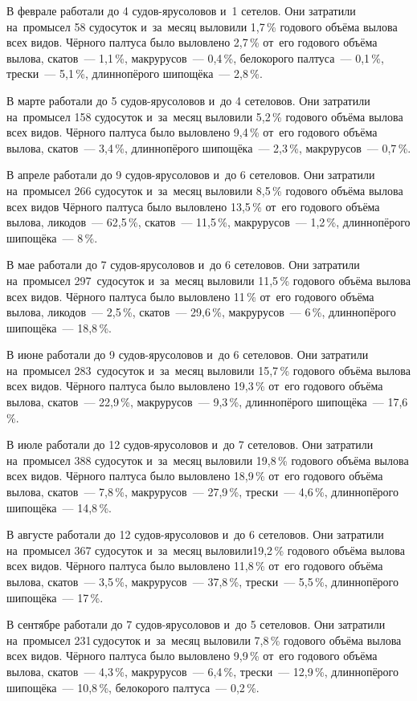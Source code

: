 В феврале работали до 4 судов-ярусоловов и~1 сетелов. Они затратили на~промысел 58 судосуток и~за~месяц выловили 1,7\,\% годового объёма вылова всех видов. Чёрного палтуса было выловлено 2,7\,\% от~его годового объёма вылова, скатов~--- 1,1\,\%, макрурусов~--- 0,4\,\%, белокорого палтуса~--- 0,1\,\%, трески~--- 5,1\,\%, длиннопёрого шипощёка~--- 2,8\,\%.

В марте работали до 5 судов-ярусоловов и~до 4 сетеловов. Они затратили на~промысел 158 судосуток и~за~месяц выловили 5,2\,\% годового объёма вылова всех видов. Чёрного палтуса было выловлено 9,4\,\% от~его годового объёма вылова, скатов~--- 3,4\,\%, длиннопёрого шипощёка~--- 2,3\,\%, макрурусов~--- 0,7\,\%.

В апреле работали до 9 судов-ярусоловов и~до 6 сетеловов. Они затратили на~промысел 266 судосуток и~за~месяц выловили 8,5\,\% годового объёма вылова всех видов Чёрного палтуса было выловлено 13,5\,\% от~его годового объёма вылова, ликодов~--- 62,5\,\%, скатов~--- 11,5\,\%, макрурусов~--- 1,2\,\%, длиннопёрого шипощёка~--- 8\,\%.

В мае работали до 7 судов-ярусоловов и~до 6 сетеловов. Они затратили на~промысел 297~судосуток и~за~месяц выловили 11,5\,\% годового объёма вылова всех видов. Чёрного палтуса было выловлено 11\,\% от~его годового объёма вылова, ликодов~--- 2,5\,\%, скатов~--- 29,6\,\%, макрурусов~--- 6\,\%, длиннопёрого шипощёка~--- 18,8\,\%.

В июне работали до 9 судов-ярусоловов и~до 6 сетеловов. Они затратили на~промысел 283~судосуток и~за~месяц выловили 15,7\,\% годового объёма вылова всех видов. Чёрного палтуса было выловлено 19,3\,\% от~его годового объёма вылова, скатов~--- 22,9\,\%, макрурусов~--- 9,3\,\%, длиннопёрого шипощёка~--- 17,6\,\%.

В июле работали до 12 судов-ярусоловов и~до 7 сетеловов. Они затратили на~промысел 388 судосуток и~за~месяц выловили 19,8\,\% годового объёма вылова всех видов. Чёрного палтуса было выловлено 18,9\,\% от~его годового объёма вылова, скатов~--- 7,8\,\%, макрурусов~--- 27,9\,\%, трески~--- 4,6\,\%, длиннопёрого шипощёка~--- 14,8\,\%.

В августе работали до 12 судов-ярусоловов и~до 6 сетеловов. Они затратили на~промысел 367 судосуток и~за~месяц выловили19,2\,\% годового объёма вылова всех видов. Чёрного палтуса было выловлено 11,8\,\% от~его годового объёма вылова, скатов~--- 3,5\,\%, макрурусов~--- 37,8\,\%, трески~--- 5,5\,\%, длиннопёрого шипощёка~--- 17\,\%.

В сентябре работали до 7 судов-ярусоловов и~до 5 сетеловов. Они затратили на~промысел 231\,судосуток и~за~месяц выловили 7,8\,\% годового объёма вылова всех видов. Чёрного палтуса было выловлено 9,9\,\% от~его годового объёма вылова, скатов~--- 4,3\,\%, макрурусов~--- 6,4\,\%, трески~--- 12,9\,\%, длиннопёрого шипощёка~--- 10,8\,\%, белокорого палтуса~--- 0,2\,\%.

